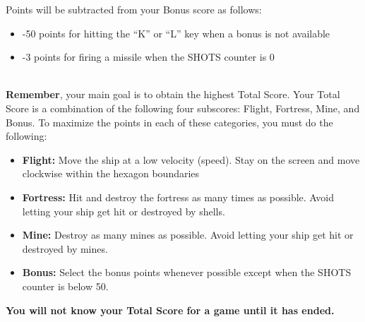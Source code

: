 \documentclass[letterpaper,12pt]{article}
\begin{document}
\noindent
Points will be subtracted from your Bonus score as follows:
\begin{itemize}
\item -50 points for hitting the “K” or “L” key when a bonus is not available
\item -3 points for firing a missile when the SHOTS counter is 0
\end{itemize}\\

\noindent
\textbf{Remember}, your main goal is to obtain the highest Total Score. Your Total Score is a
combination of the following four subscores: Flight, Fortress, Mine, and Bonus. To maximize the
points in each of these categories, you must do the following:

\begin{itemize}
\item \textbf{Flight:} Move the ship at a low velocity (speed). Stay on the screen and move
clockwise within the hexagon boundaries
\item \textbf{Fortress:} Hit and destroy the fortress as many times as possible. Avoid letting your
ship get hit or destroyed by shells.
\item \textbf{Mine:} Destroy as many mines as possible. Avoid letting your ship get hit or destroyed
by mines.
\item \textbf{Bonus:} Select the bonus points whenever possible except when the SHOTS counter is
below 50.
\end{itemize}

\begin{center}
\textbf{You will not know your Total Score for a game until it has ended.}
\end{center}
\end{document}
